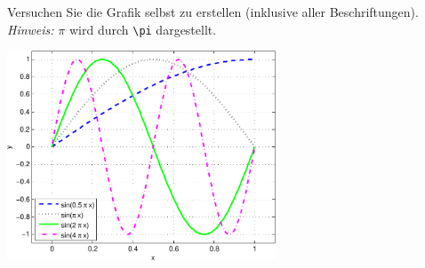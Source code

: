 \begin{aufg}[0]
Versuchen Sie die Grafik selbst zu erstellen (inklusive
aller Beschriftungen).
{\it Hinweis:} $\pi$ wird durch {\lstinline!\pi!} dargestellt. 
\begin{center}\includegraphics[width=0.6\textwidth]{figures/aufgabe2_24_11}\end{center}
\end{aufg}